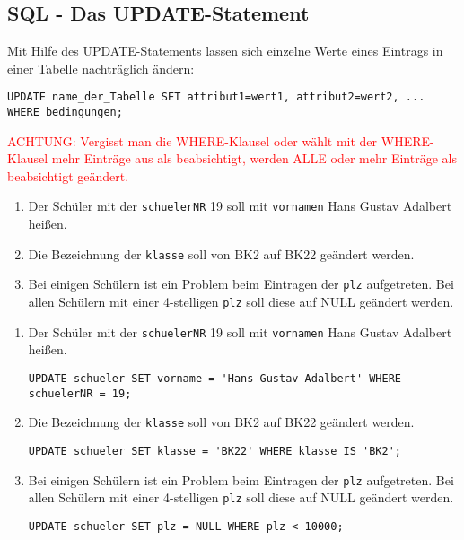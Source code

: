 \subsection[UPDATE-Statement]{SQL - Das UPDATE-Statement}\label{update}
Mit Hilfe des UPDATE-Statements lassen sich einzelne Werte eines Eintrags in einer Tabelle nachträglich ändern:
\begin{tcolorbox}[title=UPDATE-Statement]
	\lstinline[breaklines=true]!UPDATE name_der_Tabelle SET attribut1=wert1, attribut2=wert2, ... WHERE bedingungen;!
\end{tcolorbox}
\textcolor{red}{ACHTUNG: Vergisst man die WHERE-Klausel oder wählt mit der WHERE-Klausel mehr Einträge aus als beabsichtigt, werden ALLE oder mehr Einträge als beabsichtigt geändert.}
\begin{Exercise}[title={Ändere folgende Einträge aus der Datenbank:}, label=Update]
	\begin{enumerate}
		\item Der Schüler mit der \lstinline!schuelerNR! 19 soll mit \lstinline!vornamen! Hans Gustav Adalbert heißen.
		\item Die Bezeichnung der \lstinline!klasse! soll von BK2 auf BK22 geändert werden.
		\item Bei einigen Schülern ist ein Problem beim Eintragen der \lstinline!plz! aufgetreten. Bei allen Schülern mit einer 4-stelligen \lstinline!plz! soll diese auf NULL geändert werden.
	\end{enumerate}
\end{Exercise}
\begin{Answer}[ref=Update]
	\begin{enumerate}
		\item Der Schüler mit der \lstinline!schuelerNR! 19 soll mit \lstinline!vornamen! Hans Gustav Adalbert heißen.

		\lstinline!UPDATE schueler SET vorname = 'Hans Gustav Adalbert' WHERE schuelerNR = 19;!
		\item Die Bezeichnung der \lstinline!klasse! soll von BK2 auf BK22 geändert werden.

		\lstinline!UPDATE schueler SET klasse = 'BK22' WHERE klasse IS 'BK2';!
		\item Bei einigen Schülern ist ein Problem beim Eintragen der \lstinline!plz! aufgetreten. Bei allen Schülern mit einer 4-stelligen \lstinline!plz! soll diese auf NULL geändert werden.

		\lstinline!UPDATE schueler SET plz = NULL WHERE plz < 10000;!
	\end{enumerate}
\end{Answer}